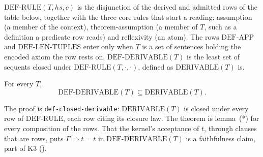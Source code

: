 $\mathrm{DEF\text{-}RULE}(T, \mathit{hs}, c)$ is the disjunction of the
derived and admitted rows of the table below, together with the three
core rules that start a reading: assumption (a member of the context),
theorem-assumption (a member of $T$, such as a definition a predicate
row reads) and reflexivity (an atom).  The rows $\mathrm{DEF\text{-}APP}$
and $\mathrm{DEF\text{-}LEN\text{-}TUPLES}$ enter only when $T$ is a set of sentences
holding the encoded axiom the row rests on.  $\mathrm{DEF\text{-}DERIVABLE}(T)$ is the
least set of sequents closed under $\mathrm{DEF\text{-}RULE}(T,\cdot,\cdot)$,
defined as $\mathrm{DERIVABLE}(T)$ is.

\begin{thm}
For every $T$,
\[
\mathrm{DEF\text{-}DERIVABLE}(T) \subseteq \mathrm{DERIVABLE}(T).
\]
\end{thm}

The proof is \texttt{def-closed-derivable}: $\mathrm{DERIVABLE}(T)$ is
closed under every row of $\mathrm{DEF\text{-}RULE}$, each row citing its
closure law.  The theorem is lemma~(*) for every composition of the
rows.  That the kernel's acceptance of $t$, through clauses that are
rows, puts $\Gamma \Longrightarrow t = t$ in
$\mathrm{DEF\text{-}DERIVABLE}(T)$ is a faithfulness claim, part of K3
().

